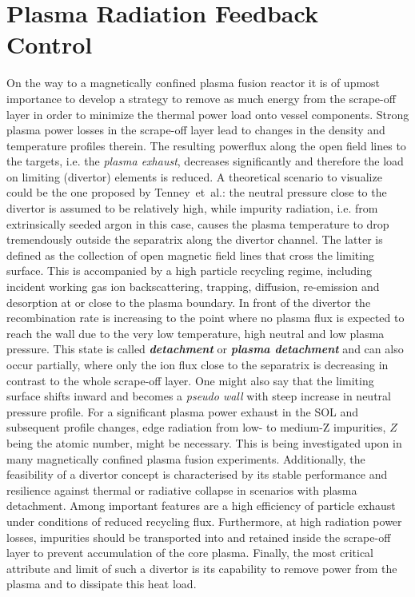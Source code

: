 %
\chapter{Plasma Radiation Feedback Control}\label{chap:realtimefeedback}%
%
    On the way to a magnetically confined plasma fusion reactor it is of upmost importance to develop a strategy to remove as much energy from the scrape-off layer in order to minimize the thermal power load onto vessel components\cite{Feng2016,Feng2005,Kallenbach2013,Pacher2007,Schmitz2020}. Strong plasma power losses in the scrape-off layer lead to changes in the density and temperature profiles therein. The resulting powerflux along the open field lines to the targets, i.e. the \textit{plasma exhaust}, decreases significantly and therefore the load on limiting (divertor) elements is reduced\cite{Kallenbach2013}. A theoretical scenario to visualize could be the one proposed by Tenney~et~al.\cite{Tenney1974}: the neutral pressure close to the divertor is assumed to be relatively high, while impurity radiation, i.e. from extrinsically seeded argon in this case, causes the plasma temperature to drop tremendously outside the separatrix along the divertor channel. The latter is defined as the collection of open magnetic field lines that cross the limiting surface. This is accompanied by a high particle recycling regime, including incident working gas ion backscattering, trapping, diffusion, re-emission and desorption at or close to the plasma boundary\cite{Marmar1978,Stangeby1990}. In front of the divertor the recombination rate is increasing to the point where no plasma flux is expected to reach the wall due to the very low temperature, high neutral and low plasma pressure. This state is called \textbf{\textit{detachment}} or \textbf{\textit{plasma detachment}} and can also occur partially, where only the ion flux close to the separatrix is decreasing in contrast to the whole scrape-off layer\cite{Loarte1998}. One might also say that the limiting surface shifts inward and becomes a \textit{pseudo wall} with steep increase in neutral pressure profile. For a significant plasma power exhaust in the SOL and subsequent profile changes, edge radiation from low- to medium-Z impurities, $Z$ being the atomic number, might be necessary. This is being investigated upon in many magnetically confined plasma fusion experiments\cite{Pacher2007,Kallenbach2013}. Additionally, the feasibility of a divertor concept is characterised by its stable performance and resilience against thermal or radiative collapse in scenarios with plasma detachment. Among important features are a high efficiency of particle exhaust under conditions of reduced recycling flux. Furthermore, at high radiation power losses, impurities should be transported into and retained inside the scrape-off layer to prevent accumulation of the core plasma. Finally, the most critical attribute and limit of such a divertor is its capability to remove power from the plasma and to dissipate this heat load.\\%
